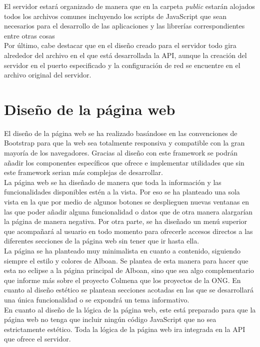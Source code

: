 El servidor estará organizado de manera que en la carpeta \textit{public} estarán alojados todos los archivos comunes incluyendo los scripts de JavaScript que sean necesarios para el desarrollo de las aplicaciones y las librerías correspondientes entre otras cosas\\

Por último, cabe destacar que en el diseño creado para el servidor todo gira alrededor del archivo en el que está desarrollada la API, aunque la creación del servidor en el puerto especificado y la configuración de red se encuentre en el archivo original del servidor.\\


\section{Diseño de la página web}
El diseño de la página web se ha realizado basándose en las convenciones de Bootstrap para que la web sea totalmente responsiva y compatible con la gran mayoría de los navegadores. Gracias al diseño con este framework se podrán añadir los componentes específicos que ofrece e implementar utilidades que sin este framework serian más complejas de desarrollar.\\

La página web se ha diseñado de manera que toda la información y las funcionalidades disponibles estén a la vista. Por eso se ha planteado una sola vista en la que por medio de algunos botones se desplieguen nuevas ventanas en las que poder añadir alguna funcionalidad o datos que de otra manera alargarían la página de manera negativa. Por otra parte, se ha diseñado un menú superior que acompañará al usuario en todo momento para ofrecerle accesos directos a las diferentes secciones de la página web sin tener que ir hasta ella.\\

La página se ha planteado muy minimalista en cuanto a contenido, siguiendo siempre el estilo y colores de Alboan. Se plantea de esta manera para hacer que esta no eclipse a la página principal de Alboan, sino que sea algo complementario que informe más sobre el proyecto Colmena que los proyectos de la ONG. En cuanto al diseño estético se plantean secciones acotadas en las que se desarrollará una única funcionalidad o se expondrá un tema informativo.\\

En cuanto al diseño de la lógica de la página web, este está preparado para que la página web no tenga que incluir ningún código JavaScript que no sea estrictamente estético. Toda la lógica de la página web ira integrada en la API que ofrece el servidor.\\

